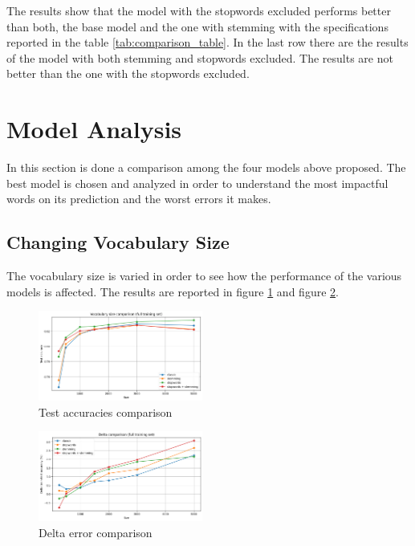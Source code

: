 \documentclass{article}
\begin{document}
\begin{multicols}{2}
\noindent The results show that the model with the stopwords excluded performs better than both, the base model and the one with stemming with the specifications reported
in the table \ref{tab:comparison_table}. In the last row there are the results of the model with both stemming and stopwords excluded. The results are not better than
the one with the stopwords excluded.


    
\section{Model Analysis}
In this section is done a comparison among the four models above proposed. The best model is chosen and  analyzed 
in order to understand the most impactful words on its prediction and the worst errors it makes.\\

\subsection{Changing Vocabulary Size}
The vocabulary size is varied in order to see how the performance of the various models is affected.
The results are reported in figure \ref{fig:comparison} and figure \ref{fig:delta}.\\

    \begin{figure}[H]
        \centering
        \includegraphics[width=0.48\textwidth]{vocsize_comparison_plot.png}
        \caption{\small Test accuracies comparison}
        \label{fig:comparison}
    \end{figure}

    \begin{figure}[H]
        \centering
        \includegraphics[width=0.48\textwidth]{delta_comparison.png}
        \caption{\small Delta error comparison}
        \label{fig:delta}
    \end{figure}


\end{multicols}
\end{document}
